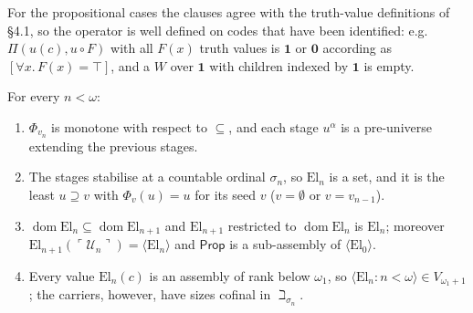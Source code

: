 \documentclass[10pt]{article}
\newcommand{\Prop}{\mathsf{Prop}}
\newcommand{\code}[1]{\ulcorner #1\urcorner}
\newcommand{\El}{\mathrm{El}}
\newcommand{\dom}{\operatorname{dom}}
\newcommand{\U}{\mathcal{U}}
\begin{document}
For the propositional cases the clauses agree with the truth-value
definitions of \S4.1, so the operator is well defined on codes that have
been identified: e.g.\ $\Pi(u(c),u\circ F)$ with all $F(x)$ truth values is
$\mathbf 1$ or $\mathbf 0$ according as $[\forall x.\,F(x)=\top]$, and a
$W$ over $\mathbf 1$ with children indexed by $\mathbf 1$ is empty.

\begin{lemma}\label{lem:lfp}
For every $n<\omega$:
\begin{enumerate}
\item $\Phi_{v_n}$ is monotone with respect to $\subseteq$, and each stage
  $u^\alpha$ is a pre-universe extending the previous stages.
\item The stages stabilise at a countable ordinal $\sigma_n$, so $\El_n$ is
  a set, and it is the least $u\supseteq v$ with $\Phi_v(u)=u$ for its seed
  $v$ ($v=\emptyset$ or $v=v_{n-1}$).
\item $\dom\El_n\subseteq\dom\El_{n+1}$ and $\El_{n+1}$ restricted to
  $\dom\El_n$ is $\El_n$; moreover $\El_{n+1}(\code{\U_n})=\langle\El_n\rangle$
  and $\Prop$ is a sub-assembly of $\langle\El_0\rangle$.
\item Every value $\El_n(c)$ is an assembly of rank below $\omega_1$, so
  $\langle\El_n:n<\omega\rangle\in V_{\omega_1+1}$; the carriers, however,
  have sizes cofinal in $\beth_{\sigma_n}$.
\end{enumerate}
\end{lemma}
\end{document}
